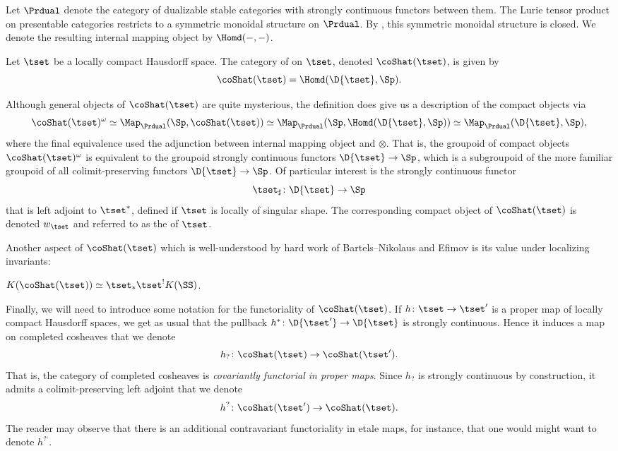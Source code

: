 Let $\Prdual$ denote the category of dualizable stable categories with strongly continuous functors between them. The Lurie tensor product on presentable categories restricts to a symmetric monoidal structure on $\Prdual$. By \cite{Ramzi2024}, this symmetric monoidal structure is closed. We denote the resulting internal mapping object by $\Homd ({-},{-})$.
\begin{defn}
  Let $\tset$ be a locally compact Hausdorff space. The category of  on $\tset$, denoted $\coShat (\tset )$, is given by
  \[
    \coShat (\tset ) = \Homd (\D{\tset},\Sp ).
  \]
\end{defn}
Although general objects of $\coShat (\tset )$ are quite mysterious, the definition does give us a description of the compact objects via
\[
  \coShat (\tset )^\omega\simeq\Map_{\Prdual}(\Sp ,\coShat (\tset ))
  \simeq\Map_{\Prdual}(\Sp,\Homd (\D{\tset},\Sp ))\simeq\Map_{\Prdual}(\D{\tset},\Sp),
\]
where the final equivalence used the adjunction between internal mapping object and $\otimes$. That is, the groupoid of compact objects $\coShat (\tset )^\omega$ is equivalent to the groupoid strongly continuous functors $\D{\tset}\to\Sp$, which is a subgroupoid of the more familiar groupoid of all colimit-preserving functors $\D{\tset}\to\Sp$. Of particular interest is the strongly continuous functor
\[
\tset_\sharp\colon\D{\tset}\to\Sp
\]
that is left adjoint to $\tset^*$, defined if $\tset$ is locally of singular shape. The corresponding compact object of $\coShat (\tset )$ is denoted $w_\tset$ and referred to as the  of $\tset$.

Another aspect of $\coShat (\tset )$ which is well-understood by hard work of Bartels--Nikolaus and Efimov is its value under localizing invariants:
\begin{thm}\label{thm: K theory of completed cosheaves}
  $K(\coShat (\tset ))\simeq \tset_*\tset^!K (\SS )$.
\end{thm}
Finally, we will need to introduce some notation for the functoriality of $\coShat (\tset )$. If $h\colon\tset\to\tset '$ is a proper map of locally compact Hausdorff spaces, we get as usual that the pullback $h^*\colon\D{\tset '}\to \D{\tset}$ is strongly continuous. Hence it induces a map on completed cosheaves that we denote
\[
h_?\colon \coShat (\tset )\to \coShat (\tset ').
\]
That is, the category of completed cosheaves is {\em covariantly functorial in proper maps}. Since $h_?$ is strongly continuous by construction, it admits a colimit-preserving left adjoint that we denote
\[
h^?\colon \coShat (\tset ')\to \coShat (\tset ).
\]
The reader may observe that there is an additional contravariant functoriality in etale maps, for instance, that one would might want to denote $h^{\text{?`}}$.


